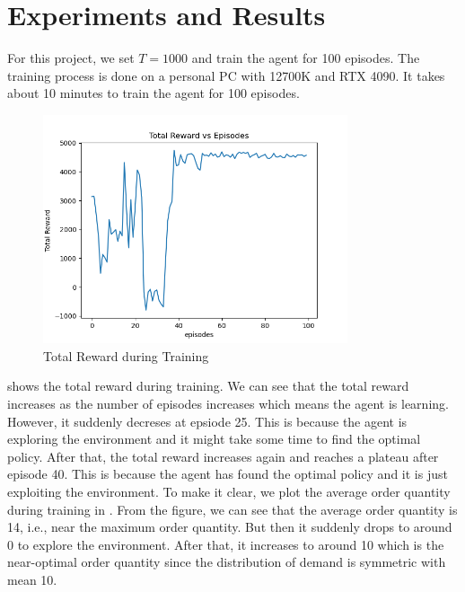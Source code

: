 \section{Experiments and Results}
For this project, we set $T=1000$ and train the agent for 100 episodes. The training process is done on a personal PC with 12700K and RTX 4090. It takes about 10 minutes to train the agent for 100 episodes. 
\begin{figure}[H]
    \centering
    \includegraphics[width=0.8\textwidth]{figure/Total Reward vs Episodes copy.png}
    \caption{Total Reward during Training}
    \label{fig:total-reward}
\end{figure}
 shows the total reward during training. We can see that the total reward increases as the number of episodes increases which means the agent is learning. However, it suddenly decreses at epsiode 25. This is because the agent is exploring the environment and it might take some time to find the optimal policy. After that, the total reward increases again and reaches a plateau after episode 40. This is because the agent has found the optimal policy and it is just exploiting the environment. To make it clear, we plot the average order quantity during training in . From the figure, we can see that the average order quantity is 14, i.e., near the maximum order quantity. But then it suddenly drops to around 0 to explore the environment. After that, it increases to around 10 which is the near-optimal order quantity since the distribution of demand is symmetric with mean 10.
